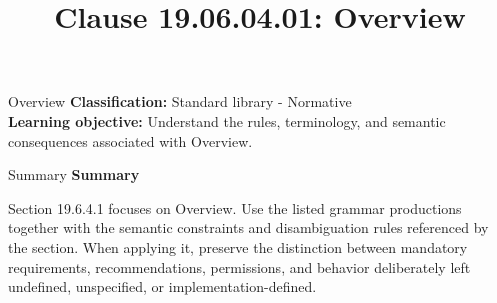 \documentclass[10pt,letterpaper]{article}
\title{Clause 19.06.04.01: Overview}
\author{}
\date{}
\begin{document}
\maketitle
\begin{CornellOverviewBox}{Overview}
\textbf{Classification:} Standard library - Normative\\[2pt]
\textbf{Learning objective:} Understand the rules, terminology, and semantic consequences associated with Overview.
\end{CornellOverviewBox}\begin{CornellSummaryBox}{Summary}
{\sffamily\bfseries\color{Accent} Summary}\par\vspace{3pt}Section 19.6.4.1 focuses on Overview. Use the listed grammar productions together with the semantic constraints and disambiguation rules referenced by the section. When applying it, preserve the distinction between mandatory requirements, recommendations, permissions, and behavior deliberately left undefined, unspecified, or implementation-defined.
\end{CornellSummaryBox}
\end{document}
